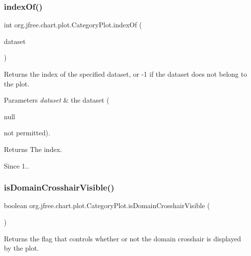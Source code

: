 \subsubsection{\texorpdfstring{index\+Of()}{indexOf()}}
{\footnotesize\ttfamily int org.\+jfree.\+chart.\+plot.\+Category\+Plot.\+index\+Of (\begin{DoxyParamCaption}\item[{\mbox{\hyperlink{interfaceorg_1_1jfree_1_1data_1_1category_1_1_category_dataset}{Category\+Dataset}}}]{dataset }\end{DoxyParamCaption})}

Returns the index of the specified dataset, or {\ttfamily -\/1} if the dataset does not belong to the plot.


\begin{DoxyParams}{Parameters}
{\em dataset} & the dataset (
\begin{DoxyCode}
null 
\end{DoxyCode}
 not permitted).\\
\hline
\end{DoxyParams}
\begin{DoxyReturn}{Returns}
The index.
\end{DoxyReturn}
\begin{DoxySince}{Since}
1.. 
\end{DoxySince}
\mbox{\label{classorg_1_1jfree_1_1chart_1_1plot_1_1_category_plot_ac2a9090ae1a302480897d3383773b168}} 
\subsubsection{\texorpdfstring{is\+Domain\+Crosshair\+Visible()}{isDomainCrosshairVisible()}}
{\footnotesize\ttfamily boolean org.\+jfree.\+chart.\+plot.\+Category\+Plot.\+is\+Domain\+Crosshair\+Visible (\begin{DoxyParamCaption}{ }\end{DoxyParamCaption})}

Returns the flag that controls whether or not the domain crosshair is displayed by the plot.

